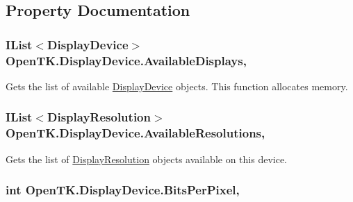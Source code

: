 \subsection{Property Documentation}
\hypertarget{class_open_t_k_1_1_display_device_afd22a63fc37c530c7fd19886d439d04c}{
\subsubsection[{Available\-Displays}]{\setlength{\rightskip}{0pt plus 5cm}I\-List$<${\bf Display\-Device}$>$ Open\-T\-K.\-Display\-Device.\-Available\-Displays\hspace{0.3cm}{\ttfamily [static]}, {\ttfamily [get]}}}\label{class_open_t_k_1_1_display_device_afd22a63fc37c530c7fd19886d439d04c}


Gets the list of available \hyperlink{class_open_t_k_1_1_display_device}{Display\-Device} objects. This function allocates memory. 

\hypertarget{class_open_t_k_1_1_display_device_a804b7e126c368b782811bc458019a7cd}{
\subsubsection[{Available\-Resolutions}]{\setlength{\rightskip}{0pt plus 5cm}I\-List$<${\bf Display\-Resolution}$>$ Open\-T\-K.\-Display\-Device.\-Available\-Resolutions\hspace{0.3cm}{\ttfamily [get]}, {\ttfamily [set]}}}\label{class_open_t_k_1_1_display_device_a804b7e126c368b782811bc458019a7cd}


Gets the list of \hyperlink{class_open_t_k_1_1_display_resolution}{Display\-Resolution} objects available on this device. 

\hypertarget{class_open_t_k_1_1_display_device_af22b160771cce81304e997ea883efcb0}{
\subsubsection[{Bits\-Per\-Pixel}]{\setlength{\rightskip}{0pt plus 5cm}int Open\-T\-K.\-Display\-Device.\-Bits\-Per\-Pixel\hspace{0.3cm}{\ttfamily [get]}, {\ttfamily [set]}}}\label{class_open_t_k_1_1_display_device_af22b160771cce81304e997ea883efcb0}


